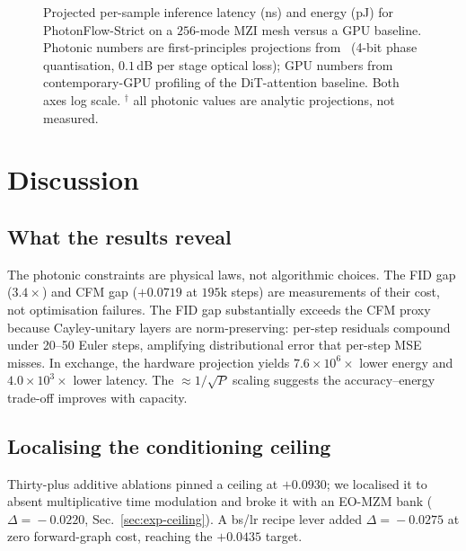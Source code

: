\documentclass[conference]{IEEEtran}
\begin{document}
\begin{figure}[tbp]
\centering

\caption{Projected per-sample inference latency (ns) and
energy (pJ) for PhotonFlow-Strict on a $256$-mode MZI mesh
versus a GPU baseline.  Photonic numbers are first-principles
projections from~\cite{shen2017,ning2024,clements2016} (4-bit
phase quantisation, $0.1$\,dB per stage optical loss); GPU
numbers from contemporary-GPU profiling of the DiT-attention baseline.
Both axes log scale.  $^\dagger$ all photonic values are
analytic projections, not measured.}
\label{fig:hardware}
\end{figure}


\section{Discussion}
\label{sec:disc}

\subsection{What the results reveal}
The photonic constraints are physical laws, not algorithmic choices.
The FID gap ($3.4{\times}$) and CFM gap ($+0.0719$ at $195$k steps)
are measurements of their cost, not optimisation failures.  The FID
gap substantially exceeds the CFM proxy because Cayley-unitary
layers are norm-preserving: per-step residuals compound under 20--50
Euler steps, amplifying distributional error that per-step MSE
misses.  In exchange, the hardware projection yields
$7.6{\times}10^6\times$ lower energy and $4.0{\times}10^3\times$
lower latency.  The $\approx\!1/\sqrt{P}$ scaling suggests the
accuracy--energy trade-off improves with capacity.

\subsection{Localising the conditioning ceiling}
Thirty-plus additive ablations
pinned a ceiling at $+0.0930$; we localised it to absent
multiplicative time modulation and broke it with an EO-MZM
bank ($\Delta\!=\!-0.0220$, Sec.~\ref{sec:exp-ceiling}).  A
bs/lr recipe lever added $\Delta\!=\!-0.0275$ at zero
forward-graph cost, reaching the $+0.0435$ target.
\end{document}
